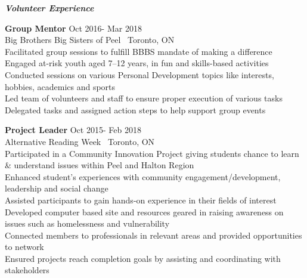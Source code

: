 \documentclass{article}
\begin{document}
\begin{center}
  \large  \textcolor{ablue}{\textit{\textbf{Volunteer Experience}}}
\end{center}

\noindent \textbf{Group Mentor}                   
\hfill Oct 2016- Mar 2018
\\Big Brothers Big Sisters of Peel   \textbar \ Toronto, ON        
\\Facilitated group sessions to fulfill BBBS mandate of making a difference
\\Engaged at-risk youth aged 7–12 years, in fun and skills-based activities
\\Conducted sessions on various Personal Development topics like interests, hobbies, academics and  sports
\\Led team of volunteers and staff to ensure proper execution of various tasks
\\Delegated tasks and assigned action steps to help support group events 

\bigskip

\noindent \textbf{Project Leader}                                                                                                                                 
\hfill Oct 2015- Feb 2018
\\Alternative Reading Week \textbar \ Toronto, ON                                                                 
\\Participated in a Community Innovation Project giving students chance to learn \& understand issues within Peel and Halton Region
\\Enhanced student’s experiences with community engagement/development, leadership and social change
\\Assisted participants to gain hands-on experience in their fields of interest
\\Developed computer based site and resources geared in raising awareness on issues such as homelessness and vulnerability
\\Connected members to professionals in relevant areas and provided opportunities to network
\\Ensured projects reach completion goals by assisting and coordinating with stakeholders
\end{document}
